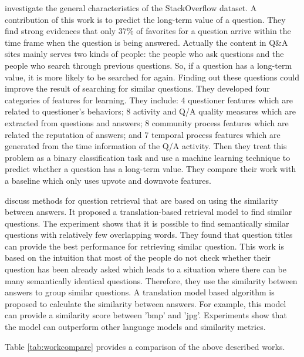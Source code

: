 \cite{anderson2012discovering} investigate the general characteristics of the StackOverflow dataset. A contribution of this work is to predict the long-term value of a question. They find strong evidences that only 37\% of favorites for a question arrive within the time frame when the question is being answered. Actually the content in Q\&A sites mainly serves two kinds of people: the people who ask questions and the people who search through previous questions. So, if a question has a long-term value, it is more likely to be searched for again. Finding out these questions could improve the result of searching for similar questions. 
They developed four categories of features for learning. They include: 4 questioner features which are related to questioner's behaviors; 8 activity and Q/A quality measures which are extracted from questions and answers; 8 community process features which are related the reputation of answers; and 7 temporal process features which are generated from the time information of the Q/A activity.
Then they treat this problem as a binary classification task and use a machine learning technique to predict whether a question has a long-term value. They compare their work with a baseline which only uses upvote and downvote features. 

\cite{chp2jeon2005finding}
discuss methods for question retrieval that are based on using the similarity between answers. It proposed a translation-based retrieval model to find similar questions. The experiment shows that it is possible to find semantically similar questions with relatively few overlapping words.
They found that question titles can provide the best performance for retrieving similar question. This work is based on the intuition that most of the people do not check whether their question has been already asked which leads to a situation where there can be many semantically identical questions. Therefore, they use the similarity between answers to group similar questions. A translation model based algorithm is proposed to calculate the similarity between answers. For example, this model can provide a similarity score between 'bmp' and 'jpg'. Experiments show that the model can outperform other language models and similarity metrics. 

Table \ref{tab:workcompare} provides a comparison of the above described works.

